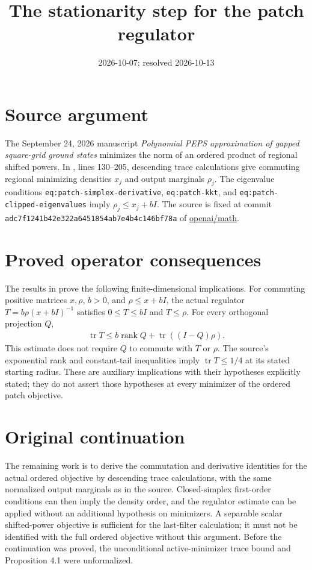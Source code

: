 \documentclass{article}
\title{The stationarity step for the patch regulator}
\author{}
\date{2026-10-07; resolved 2026-10-13}
\begin{document}
\maketitle
{}

\section{Source argument}
The September 24, 2026 manuscript \emph{Polynomial PEPS approximation of
gapped square-grid ground states} minimizes the norm of an ordered product
of regional shifted powers. In , lines 130--205,
descending trace calculations give commuting regional minimizing densities
$x_j$ and output marginals $\rho_j$. The eigenvalue conditions
\texttt{eq:patch-simplex-derivative}, \texttt{eq:patch-kkt}, and
\texttt{eq:patch-clipped-eigenvalues} imply $\rho_j\le x_j+bI$.
The source is fixed at commit
\texttt{adc7f1241b42e322a6451854ab7e4b4c146bf78a} of
\href{https://github.com/openai/math}{openai/math}.

\section{Proved operator consequences}
The results in  prove the following
finite-dimensional implications. For commuting positive matrices $x,\rho$,
$b>0$, and $\rho\le x+bI$, the actual regulator
$T=b\rho(x+bI)^{-1}$ satisfies $0\le T\le bI$ and $T\le\rho$.
For every orthogonal projection $Q$,
\begin{align}
 \operatorname{tr}T\le b\operatorname{rank}Q+
   \operatorname{tr}((I-Q)\rho).
\end{align}
This estimate does not require $Q$ to commute with $T$ or $\rho$.
The source's exponential rank and constant-tail inequalities imply
$\operatorname{tr}T\le1/4$ at its stated starting radius. These are
auxiliary implications with their hypotheses explicitly stated; they do not
assert those hypotheses at every minimizer of the ordered patch objective.

\section{Original continuation}
The remaining work is to derive the commutation and derivative identities
for the actual ordered objective by descending trace calculations, with
the same normalized output marginals as in the source. Closed-simplex
first-order conditions can then imply the density order, and the regulator
estimate can be applied without an additional hypothesis on minimizers.
A separable scalar shifted-power objective is sufficient for the last-filter
calculation; it must not be identified with the full ordered objective
without this argument. Before the continuation was proved, the
unconditional active-minimizer trace bound and Proposition 4.1 were
unformalized.
\end{document}
